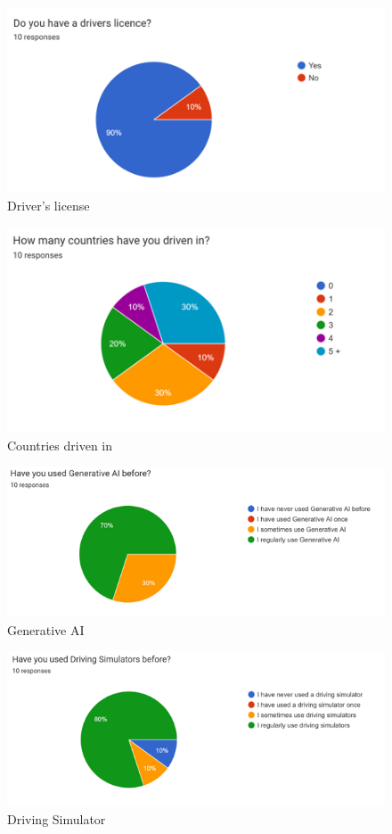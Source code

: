 \begin{figure}[H]
    \centering
    \includegraphics[width=0.5\linewidth]{images/drivers_license.png}
    \caption{Driver's license}
    \label{drivers-license}
\end{figure}

\begin{figure}[H]
    \centering
    \includegraphics[width=0.6\linewidth]{images/countries_driven_in.png}
    \caption{Countries driven in}
    \label{countries-driven-in}
\end{figure}

\begin{figure}[H]
    \centering
    \includegraphics[width=0.7\linewidth]{images/gen_ai.png}
    \caption{Generative AI}
    \label{genai}
\end{figure}

\begin{figure}[H]
    \centering
    \includegraphics[width=0.7\linewidth]{images/driving_sim.png}
    \caption{Driving Simulator}
    \label{driving-simulator}
\end{figure}

